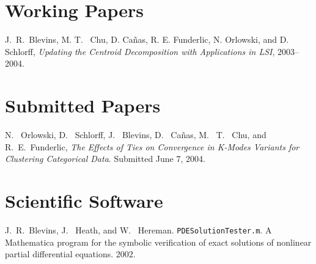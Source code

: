 \documentclass[overlapped,line,draft,11pt,letterpaper]{res}
\begin{document}
\begin{resume}

%


\newpage

\section{\bf Working Papers}

J.\ R.\ Blevins, M. T. \ Chu, D. Ca\~{n}as, R. E. Funderlic, N.
Orlowski, and D. Schlorff, {\em Updating the Centroid Decomposition
  with Applications in LSI}, 2003--2004.


\section{\bf Submitted Papers}

N. \ Orlowski, D. \ Schlorff, J. \ Blevins, D. \ Ca\~{n}as, M. \ T. \
Chu, and R.\ E.\ Funderlic, {\em The Effects of Ties on Convergence in
  K-Modes Variants for Clustering Categorical Data}. Submitted June 7,
2004.


\section{\bf Scientific Software}

J.\ R.\ Blevins, J. \ Heath, and W. \ Hereman.
\texttt{PDESolutionTester.m}.  A Mathematica program for the symbolic
verification of exact solutions of nonlinear partial differential
equations. 2002.


\end{resume}
\end{document}
